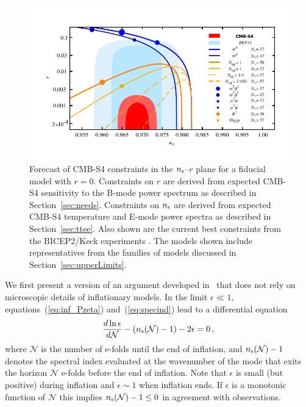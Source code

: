 \begin{figure}[ht]
\centering
\includegraphics[width=6in]{Inflation/nsrlabeledr0v3s}
\caption{Forecast of CMB-S4 constraints in the $n_{\rm s}$--$r$ plane for a fiducial model with $r=0$. Constraints 
on $r$ are derived from expected CMB-S4 sensitivity to the B-mode power spectrum as described in 
Section~\ref{sec:needs}. Constraints on $n_{\rm s}$ are derived from expected CMB-S4 temperature and 
E-mode power spectra as described in Section~\ref{sec:ttee}. Also shown are the current best constraints
from the BICEP2/Keck experiments \cite{Ade:2015fwj}. The models shown include representatives from 
the families of models discussed in Section~\ref{sec:upperLimits}.
}
\label{fig:nsr0}
\end{figure}

We first present a version of an argument developed in~\cite{Mukhanov:2013tua,Roest:2013fha,Creminelli:2014nqa} that does not rely on microscopic details of inflationary models. In the limit $\epsilon\ll1$, equations~(\ref{eq:inf_Pzeta}) and~(\ref{eq:specind}) lead to a differential equation
\begin{equation}\label{eq:epsdiffeq}
\frac{d\ln\epsilon}{d\mathcal{N}}-(n_{\rm s}(\mathcal{N})-1)-2\epsilon=0\,,
\end{equation} 
where $\mathcal{N}$ is the number of e-folds until the end of inflation, and $n_{\rm s}(\mathcal{N})-1$ denotes the spectral index evaluated at the wavenumber of the mode that exits the horizon $\mathcal{N}$ e-folds before the end of inflation. Note that $\epsilon$ is small (but positive) during inflation and $\epsilon\sim 1$ when inflation ends. If $\epsilon$ is a monotonic function of $\mathcal{N}$ this implies $n_{\rm s}(\mathcal{N})-1\leq 0$ in agreement with observations. 


